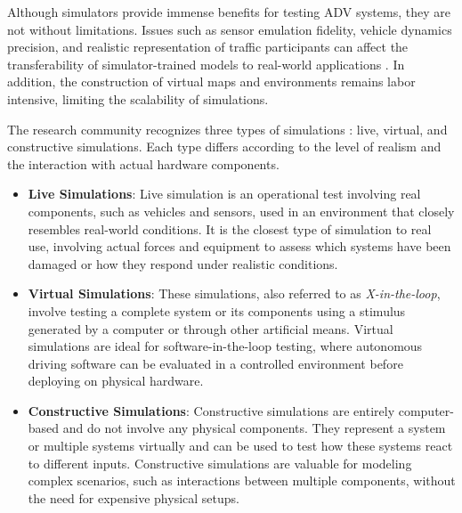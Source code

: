Although simulators provide immense benefits for testing ADV systems, they are not without limitations. Issues such as sensor emulation fidelity, vehicle dynamics precision, and realistic representation of traffic participants can affect the transferability of simulator-trained models to real-world applications \cite{Li2024}. In addition, the construction of virtual maps and environments remains labor intensive, limiting the scalability of simulations.

The research community recognizes three types of simulations \cite{Rosique2019}: live, virtual, and constructive simulations. Each type differs according to the level of realism and the interaction with actual hardware components.

\begin{itemize}
\item \textbf{Live Simulations}: Live simulation is an operational test involving real components, such as vehicles and sensors, used in an environment that closely resembles real-world conditions. It is the closest type of simulation to real use, involving actual forces and equipment to assess which systems have been damaged or how they respond under realistic conditions.
\item \textbf{Virtual Simulations}: These simulations, also referred to as \textit{X-in-the-loop}, involve testing a complete system or its components using a stimulus generated by a computer or through other artificial means. Virtual simulations are ideal for software-in-the-loop testing, where autonomous driving software can be evaluated in a controlled environment before deploying on physical hardware.
\item \textbf{Constructive Simulations}: Constructive simulations are entirely computer-based and do not involve any physical components. They represent a system or multiple systems virtually and can be used to test how these systems react to different inputs. Constructive simulations are valuable for modeling complex scenarios, such as interactions between multiple components, without the need for expensive physical setups.
\end{itemize}



